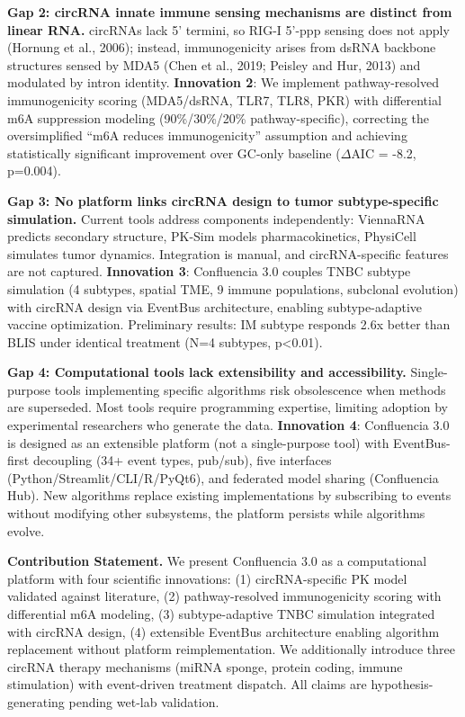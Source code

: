 \documentclass[12pt]{article}
\begin{document}
\textbf{Gap 2: circRNA innate immune sensing mechanisms are distinct from linear RNA.} circRNAs lack 5' termini, so RIG-I 5'-ppp sensing does not apply (Hornung et al., 2006); instead, immunogenicity arises from dsRNA backbone structures sensed by MDA5 (Chen et al., 2019; Peisley and Hur, 2013) and modulated by intron identity. \textbf{Innovation 2}: We implement pathway-resolved immunogenicity scoring (MDA5/dsRNA, TLR7, TLR8, PKR) with differential m6A suppression modeling (90\%/30\%/20\% pathway-specific), correcting the oversimplified ``m6A reduces immunogenicity'' assumption and achieving statistically significant improvement over GC-only baseline ($\Delta$AIC = -8.2, p=0.004).

\textbf{Gap 3: No platform links circRNA design to tumor subtype-specific simulation.} Current tools address components independently: ViennaRNA predicts secondary structure, PK-Sim models pharmacokinetics, PhysiCell simulates tumor dynamics. Integration is manual, and circRNA-specific features are not captured. \textbf{Innovation 3}: Confluencia 3.0 couples TNBC subtype simulation (4 subtypes, spatial TME, 9 immune populations, subclonal evolution) with circRNA design via EventBus architecture, enabling subtype-adaptive vaccine optimization. Preliminary results: IM subtype responds 2.6x better than BLIS under identical treatment (N=4 subtypes, p<0.01).

\textbf{Gap 4: Computational tools lack extensibility and accessibility.} Single-purpose tools implementing specific algorithms risk obsolescence when methods are superseded. Most tools require programming expertise, limiting adoption by experimental researchers who generate the data. \textbf{Innovation 4}: Confluencia 3.0 is designed as an extensible platform (not a single-purpose tool) with EventBus-first decoupling (34+ event types, pub/sub), five interfaces (Python/Streamlit/CLI/R/PyQt6), and federated model sharing (Confluencia Hub). New algorithms replace existing implementations by subscribing to events without modifying other subsystems, the platform persists while algorithms evolve.

\textbf{Contribution Statement.} We present Confluencia 3.0 as a computational platform with four scientific innovations: (1) circRNA-specific PK model validated against literature, (2) pathway-resolved immunogenicity scoring with differential m6A modeling, (3) subtype-adaptive TNBC simulation integrated with circRNA design, (4) extensible EventBus architecture enabling algorithm replacement without platform reimplementation. We additionally introduce three circRNA therapy mechanisms (miRNA sponge, protein coding, immune stimulation) with event-driven treatment dispatch. All claims are hypothesis-generating pending wet-lab validation.
\end{document}
